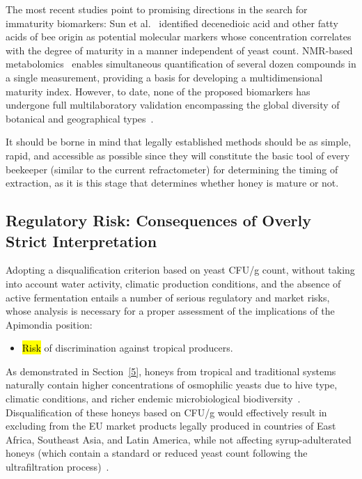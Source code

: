 \documentclass[foods,review,accept,pdftex,moreauthors]{Definitions/mdpi}
\begin{document}
{The most recent studies point to promising directions in the search
for immaturity biomarkers: Sun et al.~\cite{sun2021} identified
decenedioic acid and other fatty acids of bee origin as potential
molecular markers whose concentration correlates with the degree of
maturity in a manner independent of yeast count. NMR-based
metabolomics~\cite{nmrhoney2023} enables simultaneous quantification
of several dozen compounds in a single measurement, providing
a basis for developing a multidimensional maturity index. However,
to date, none of the proposed biomarkers has undergone full
multilaboratory validation encompassing the global diversity of
botanical and geographical types~\cite{tsagkaris2021}.

It should be borne in mind that legally established methods should
be as simple, rapid, and accessible as possible since they will
constitute the basic tool of every beekeeper (similar to the current
refractometer) for determining the timing of extraction, as it is
this stage that determines whether honey is mature or not.


\subsection{Regulatory Risk: Consequences of Overly Strict Interpretation}


Adopting a disqualification criterion based on yeast CFU/g count,
without taking into account water activity, climatic production
conditions, and the absence of active fermentation entails a number
of serious regulatory and market risks, whose analysis is necessary
for a proper assessment of the implications of the Apimondia
position:

\begin{itemize}
        \item {\hl{Risk} %
 of discrimination against tropical producers.}
        \end{itemize}

As demonstrated in Section~\ref{5}, honeys from tropical and traditional
systems naturally contain higher concentrations of osmophilic yeasts
due to hive type, climatic conditions, and richer endemic
microbiological
biodiversity~\cite{tadele2025,stinglessyeastbrazil2021}.
Disqualification of these honeys based on CFU/g would effectively
result in excluding from the EU market products legally produced
in countries of East Africa, Southeast Asia, and Latin America,
while not affecting syrup-adulterated honeys (which contain a
standard or reduced yeast count following the ultrafiltration
process)~\cite{eufromhives2021}.

}
\end{document}
